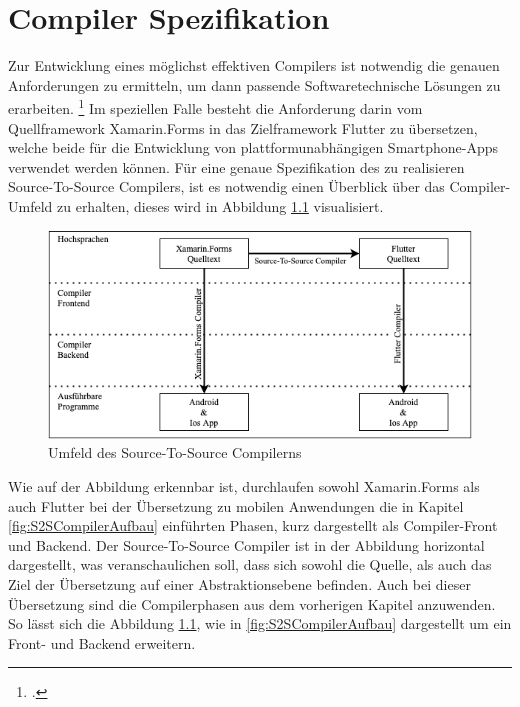\chapter{Compiler Spezifikation}
\label{chap:CompilerEntwurf}
Zur Entwicklung eines möglichst effektiven Compilers ist notwendig die genauen Anforderungen zu ermitteln,  um dann passende Softwaretechnische Lösungen zu erarbeiten. \footcite[Vgl.][S.6]{Balzert2011} Im speziellen Falle besteht die Anforderung darin vom Quellframework Xamarin.Forms in das Zielframework Flutter zu übersetzen,  welche beide für die Entwicklung von plattformunabhängigen Smartphone-Apps verwendet werden können.  Für eine genaue Spezifikation des zu realisieren Source-To-Source Compilers,  ist es notwendig einen Überblick über das Compiler-Umfeld zu erhalten,  dieses wird in Abbildung \ref{fig:CompilerArchitecture} visualisiert. 

\begin{figure}[!ht]
 \includegraphics[width=14.5cm]{Images/CompilerArchitecture/CompilerStructure.png}
 \caption{Umfeld des Source-To-Source Compilerns}
 \label{fig:CompilerArchitecture}
\end{figure}

Wie auf der Abbildung erkennbar ist,  durchlaufen sowohl Xamarin.Forms als auch Flutter bei der Übersetzung zu mobilen Anwendungen die in Kapitel \ref{fig:S2SCompilerAufbau} einführten Phasen,  kurz dargestellt als Compiler-Front und Backend.  Der Source-To-Source Compiler ist in der Abbildung horizontal dargestellt,  was veranschaulichen soll,  dass sich sowohl die Quelle,  als auch das Ziel der Übersetzung auf einer Abstraktionsebene befinden.  Auch bei dieser Übersetzung sind die Compilerphasen aus dem vorherigen Kapitel anzuwenden.  So lässt sich die Abbildung \ref{fig:CompilerArchitecture},  wie in \ref{fig:S2SCompilerAufbau} dargestellt um ein Front- und Backend erweitern.

